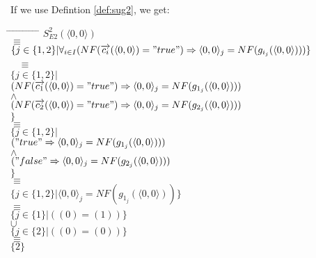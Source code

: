 \documentclass[a4paper,10pt]{article}
\theoremstyle{plain}
\theoremstyle{definition}
\newcommand{\ovr}{\overrightarrow}
\begin{document}
\begin{defn}
\begin{example} [Let $E2$ be]
\begin{verbatim}
\end{verbatim}
\end{example}
If we use Defintion \ref{def:sug2}, we get:
\begin{tabbing}
\hspace*{5.mm} \= \hspace*{5.mm} \= \hspace*{5.mm} \= \hspace*{5.mm} \= \hspace*{5.mm} \= \hspace*{5.mm}  \= \hspace*{5.mm}  \= \hspace*{5.mm}  \= \hspace*{5.mm} \= \hspace*{5.mm} \= \hspace*{5.mm}\kill
\> \> $S_{E2}^2(\langle 0, 0 \rangle)$\\
\> $\equiv$\\
\> \> $\lbrace j \in \lbrace 1, 2 \rbrace \vert \forall_{i\in I} (NF(\ovr{c_i}( \langle  0,  0\rangle ) = "true") \Rightarrow  \langle  0,  0\rangle_j = NF(g_{i_j}( \langle  0,  0\rangle)))\rbrace $\\\
\> $\equiv$ \\
\> \>$\lbrace j \in \lbrace 1, 2 \rbrace \vert $ \\
\> \> \> $(NF(\ovr{c_1}( \langle  0,  0\rangle ) = "true") \Rightarrow  \langle  0,  0\rangle_j = NF(g_{1_j}( \langle  0,  0\rangle))) $\\
\> \> \> $\wedge$ \\
\> \> \> $ (NF(\ovr{c_2}( \langle  0,  0\rangle ) = "true") \Rightarrow  \langle  0,  0\rangle_j = NF(g_{2_j}( \langle  0,  0\rangle))) $ \\
\> \>$
\rbrace $\\
\> $\equiv$ \\
\> \> $\lbrace j \in \lbrace 1, 2 \rbrace \vert $\\
\> \> \> $("true" \Rightarrow  \langle  0,  0\rangle_j = NF(g_{1_j}( \langle  0,  0\rangle)))$ \\
\> \> \> $\wedge$ \\
\> \> \> $("false" \Rightarrow  \langle  0,  0\rangle_j = NF(g_{2_j}( \langle  0,  0\rangle)))$ \\
\> \> $\rbrace $\\
\> $\equiv$ \\
\> \> $\lbrace j \in \lbrace 1, 2 \rbrace \vert 
\langle  0,  0\rangle_j = NF(g_{1_j}( \langle  0,  0\rangle))
\rbrace $\\
\> $\equiv$\\
\> \> $\lbrace j \in \lbrace 1 \rbrace \vert (( 0)  = ( 1)) \rbrace $\\
\> \> $\cup$ \\
\> \> $\lbrace j \in \lbrace 2 \rbrace \vert (( 0)  = ( 0)) \rbrace $\\
\> $\equiv $ \\
\> \> $\lbrace 2 \rbrace$ \\
\end{tabbing}


\end{defn}
\end{document}
